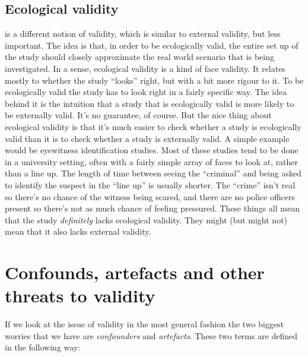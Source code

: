 \subsection{Ecological validity}

 is a different notion of validity, which is similar to external validity, but less important. The idea is that, in order to be ecologically valid, the entire set up of the study should closely approximate the real world scenario that is being investigated. In a sense, ecological validity is a kind of face validity. It relates mostly to whether the study ``looks'' right, but with a bit more rigour to it. To be ecologically valid the study has to look right in a fairly specific way. The idea behind it is the intuition that a study that is ecologically valid is more likely to be externally valid. It's no guarantee, of course. But the nice thing about ecological validity is that it's much easier to check whether a study is ecologically valid than it is to check whether a study is externally valid. A simple example would be eyewitness identification studies. Most of these studies tend to be done in a university setting, often with a fairly simple array of faces to look at, rather than a line up. The length of time between seeing the ``criminal'' and being asked to identify the suspect in the ``line up'' is usually shorter. The ``crime'' isn't real so there's no chance of the witness being scared, and there are no police officers present so there's not as much chance of feeling pressured. These things all mean that the study {\it definitely} lacks ecological validity. They might (but might not) mean that it also lacks external validity.


\section{Confounds, artefacts and other threats to validity}

If we look at the issue of validity in the most general fashion the two biggest worries that we have are {\it confounders} and {\it artefacts}. These two terms are defined in the following way:

